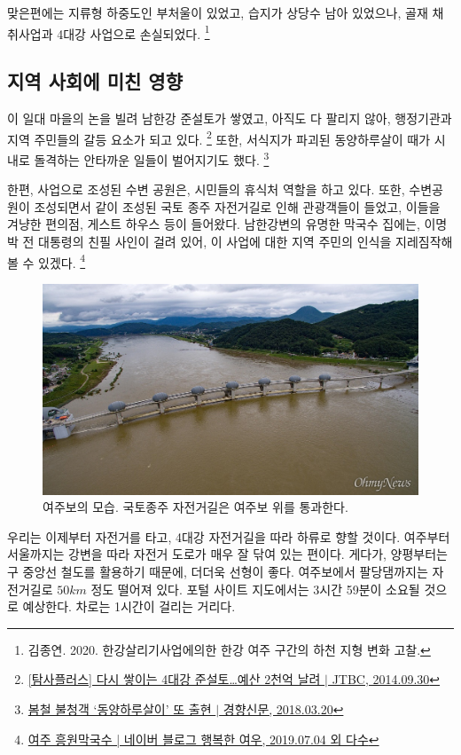 맞은편에는 지류형 하중도인 부처울이 있었고, 습지가 상당수 남아 있었으나, 골재 채취사업과 4대강 사업으로 손실되었다.
\footnote{김종연. 2020. 한강살리기사업에의한 한강 여주 구간의 하천 지형 변화 고찰.}

\subsection{지역 사회에 미친 영향}
이 일대 마을의 논을 빌려 남한강 준설토가 쌓였고,
아직도 다 팔리지 않아, 행정기관과 지역 주민들의 갈등 요소가 되고 있다.
\footnote{\href{https://news.jtbc.joins.com/article/article.aspx?news_id=NB10593178}{[탐사플러스] 다시 쌓이는 4대강 준설토…예산 2천억 날려 $|$ JTBC, 2014.09.30}}
또한, 서식지가 파괴된 동양하루살이 때가 시내로 돌격하는 안타까운 일들이 벌어지기도 했다.
\footnote{\href{http://news.khan.co.kr/kh_news/khan_art_view.html?artid=201803201448001&code=620109}{봄철 불청객 `동양하루살이' 또 출현 $|$ 경향신문, 2018.03.20}}

한편, 사업으로 조성된 수변 공원은, 시민들의 휴식처 역할을 하고 있다.
또한, 수변공원이 조성되면서 같이 조성된 국토 종주 자전거길로 인해 관광객들이 들었고,
이들을 겨냥한 편의점, 게스트 하우스 등이 들어왔다.
남한강변의 유명한 막국수 집에는, 이명박 전 대통령의 친필 사인이 걸려 있어,
이 사업에 대한 지역 주민의 인식을 지레짐작해 볼 수 있겠다.
\footnote{\href{https://blog.naver.com/lovelyiii/221577715597}{여주 흥원막국수 | 네이버 블로그 행복한 여우, 2019.07.04 외 다수}}

\begin{figure}[ht]
    \centering
    \includegraphics[width=.6\textwidth]{img/여주보.jpg}
    \caption{여주보의 모습. 국토종주 자전거길은 여주보 위를 통과한다. \protect\footnotemark}
    \label{fig:my_labe7}
\end{figure}


우리는 이제부터 자전거를 타고, 4대강 자전거길을 따라 하류로 향할 것이다.
여주부터 서울까지는 강변을 따라 자전거 도로가 매우 잘 닦여 있는 편이다.
게다가, 양평부터는 구 중앙선 철도를 활용하기 때문에, 더더욱 선형이 좋다.
여주보에서 팔당댐까지는 자전거길로 $50km$ 정도 떨어져 있다. 
포털 사이트 지도에서는 3시간 59분이 소요될 것으로 예상한다.
차로는 1시간이 걸리는 거리다.

